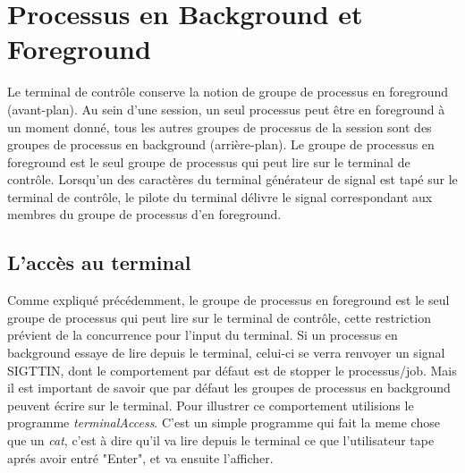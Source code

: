 \section{Processus en Background et Foreground}

Le terminal de contrôle conserve la notion de groupe de processus en foreground (avant-plan). Au sein d'une session, un seul processus peut être en foreground
à un moment donné, tous les autres groupes de processus de la session sont des groupes de processus en background (arrière-plan). Le groupe de processus en foreground
est le seul groupe de processus qui peut lire sur le terminal de contrôle. Lorsqu'un des caractères du terminal générateur de signal est tapé sur
le terminal de contrôle, le pilote du terminal délivre le signal correspondant aux membres du groupe de processus d’en foreground.


\subsection{L’accès au terminal}

Comme expliqué précédemment, le groupe de processus en foreground est le seul groupe de processus qui peut lire sur le terminal de contrôle,
cette restriction prévient de la concurrence pour l’input du terminal. Si un processus en background essaye de lire depuis le terminal, celui-ci
se verra renvoyer un signal SIGTTIN, dont le comportement par défaut est de stopper le processus/job. Mais il est important de savoir que par défaut
les groupes de processus en background peuvent écrire sur le terminal.
\newline
Pour illustrer ce comportement utilisions le programme \textit{terminalAccess}. C'est un simple programme qui fait la meme chose que un \textit{cat}, c'est à dire
qu'il va lire depuis le terminal ce que l'utilisateur tape aprés avoir entré "Enter", et va ensuite l'afficher.

